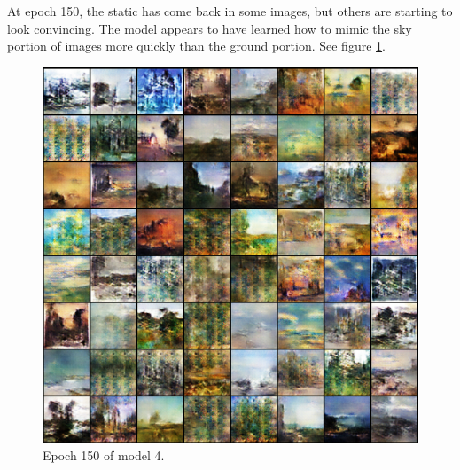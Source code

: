 \documentclass[11pt,letterpaper]{article}
\begin{document}
				At epoch 150, the static has come back in some images, but others are starting to look convincing.
				The model appears to have learned how to mimic the sky portion of images more quickly than the ground portion.
				See figure \ref{fig:wa64:epoch150generator}.
				\begin{figure}
					\centering
					\includegraphics[width=1.0\linewidth]{results/model4/epoch150_generator}
					\caption{Epoch 150 of model 4.}
					\label{fig:wa64:epoch150generator}
				\end{figure}
\end{document}

